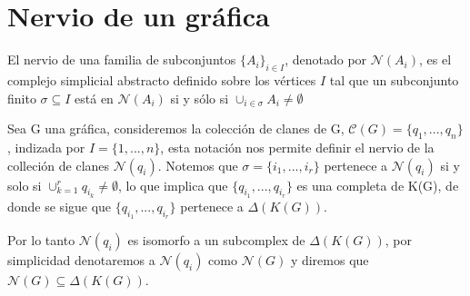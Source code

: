 \section{Nervio de un gráfica}
\begin{Defi} 
El nervio de una familia de subconjuntos ${\{A_i\}}_{i\in I}$, denotado por $\mathcal{N}(A_i)$, es el complejo simplicial abstracto definido sobre los vértices $I$ tal que un subconjunto finito $\sigma \subseteq I$ está en $\mathcal{N}(A_i)$ si y sólo si ${\cup}_{i\in \sigma}A_i \neq \emptyset$
\end{Defi}
\begin{Ejem}
Sea G una gráfica, consideremos la colección de clanes de G, $\mathcal{C}(G) = \{q_1,...,q_n\}$, indizada por $I =\{1,...,n\}$, esta notación nos permite definir el nervio de la colleción de clanes $\mathcal{N}(q_i)$. Notemos que $\sigma = \{i_1,...,i_r\}$ pertenece a $\mathcal{N}(q_i)$ si y solo si $\cup_{k=1}^{r}q_{i_k}\neq\emptyset$, lo que implica que $\{q_{i_1},...,q_{i_r}\}$ es una completa de K(G), de donde se sigue que $\{q_{i_1},...,q_{i_r}\}$ pertenece a $\Delta(K(G))$.

Por lo tanto $\mathcal{N}(q_i)$ es isomorfo a un subcomplex de $\Delta(K(G))$, por simplicidad denotaremos a $\mathcal{N}(q_i)$ como $\mathcal{N}(G)$ y diremos que $\mathcal{N}(G)\subseteq \Delta(K(G))$.
\end{Ejem}
